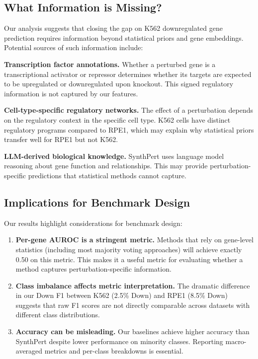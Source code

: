 \documentclass[11pt]{article}
\begin{document}
\subsection{What Information is Missing?}

Our analysis suggests that closing the gap on K562 downregulated gene prediction requires information beyond statistical priors and gene embeddings. Potential sources of such information include:

\textbf{Transcription factor annotations.} Whether a perturbed gene is a transcriptional activator or repressor determines whether its targets are expected to be upregulated or downregulated upon knockout. This signed regulatory information is not captured by our features.

\textbf{Cell-type-specific regulatory networks.} The effect of a perturbation depends on the regulatory context in the specific cell type. K562 cells have distinct regulatory programs compared to RPE1, which may explain why statistical priors transfer well for RPE1 but not K562.

\textbf{LLM-derived biological knowledge.} SynthPert uses language model reasoning about gene function and relationships. This may provide perturbation-specific predictions that statistical methods cannot capture.

\subsection{Implications for Benchmark Design}

Our results highlight considerations for benchmark design:

\begin{enumerate}
    \item \textbf{Per-gene AUROC is a stringent metric.} Methods that rely on gene-level statistics (including most majority voting approaches) will achieve exactly 0.50 on this metric. This makes it a useful metric for evaluating whether a method captures perturbation-specific information.

    \item \textbf{Class imbalance affects metric interpretation.} The dramatic difference in our Down F1 between K562 (2.5\% Down) and RPE1 (8.5\% Down) suggests that raw F1 scores are not directly comparable across datasets with different class distributions.

    \item \textbf{Accuracy can be misleading.} Our baselines achieve higher accuracy than SynthPert despite lower performance on minority classes. Reporting macro-averaged metrics and per-class breakdowns is essential.
\end{enumerate}
\end{document}
